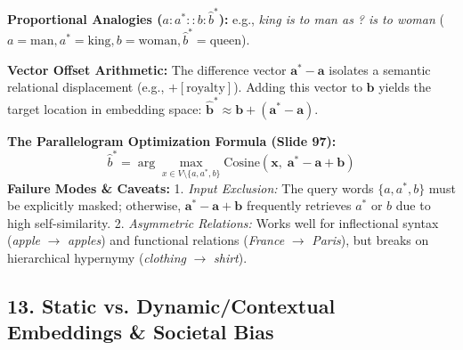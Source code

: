 \documentclass[10pt,a4paper]{article}
\begin{document}
\begin{examplebox}
\footnotesize
\textbf{Proportional Analogies ($a : a^* :: b : \hat{b}^*$):} e.g., \textit{king is to man as ? is to woman} ($a = \text{man}, a^* = \text{king}, b = \text{woman}, \hat{b}^* = \text{queen}$).

\noindent\textbf{Vector Offset Arithmetic:} The difference vector $\mathbf{a}^* - \mathbf{a}$ isolates a semantic relational displacement (e.g., $+[\text{royalty}]$). Adding this vector to $\mathbf{b}$ yields the target location in embedding space: $\hat{\mathbf{b}}^* \approx \mathbf{b} + (\mathbf{a}^* - \mathbf{a})$.

\noindent\textbf{The Parallelogram Optimization Formula (Slide 97):}
\begin{equation}
    \hat{b}^* = \arg\max_{x \in V \setminus \{a, a^*, b\}} \text{Cosine}(\mathbf{x}, \; \mathbf{a}^* - \mathbf{a} + \mathbf{b})
\end{equation}
\textbf{Failure Modes \& Caveats:}
1. \textit{Input Exclusion:} The query words $\{a, a^*, b\}$ must be explicitly masked; otherwise, $\mathbf{a}^* - \mathbf{a} + \mathbf{b}$ frequently retrieves $a^*$ or $b$ due to high self-similarity.
2. \textit{Asymmetric Relations:} Works well for inflectional syntax (\textit{apple} $\to$ \textit{apples}) and functional relations (\textit{France} $\to$ \textit{Paris}), but breaks on hierarchical hypernymy (\textit{clothing} $\to$ \textit{shirt}).
\end{examplebox}

\vspace{-2pt}
\subsection*{\color{themeblue} 13. Static vs. Dynamic/Contextual Embeddings \& Societal Bias}
\vspace{-2pt}
\end{document}
